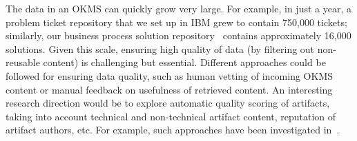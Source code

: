 The data in an OKMS can quickly grow very large. For example, in just a year, a
problem ticket repository that we set up in IBM grew to contain 750,000 tickets;
similarly, our business process solution repository~\cite{Goodwin:2012b}
contains approximately 16,000 solutions. Given this scale, ensuring high quality
of data (\eg by filtering out non-reusable content) is challenging but
essential. Different approaches could be followed for ensuring data quality,
such as human vetting of incoming OKMS content or manual feedback on usefulness
of retrieved content. An interesting research direction would be to explore
automatic quality scoring of artifacts, taking into account technical and
non-technical artifact content, reputation of artifact authors, etc. For
example, such approaches have been investigated in~\cite{Majumdar:2011}.



